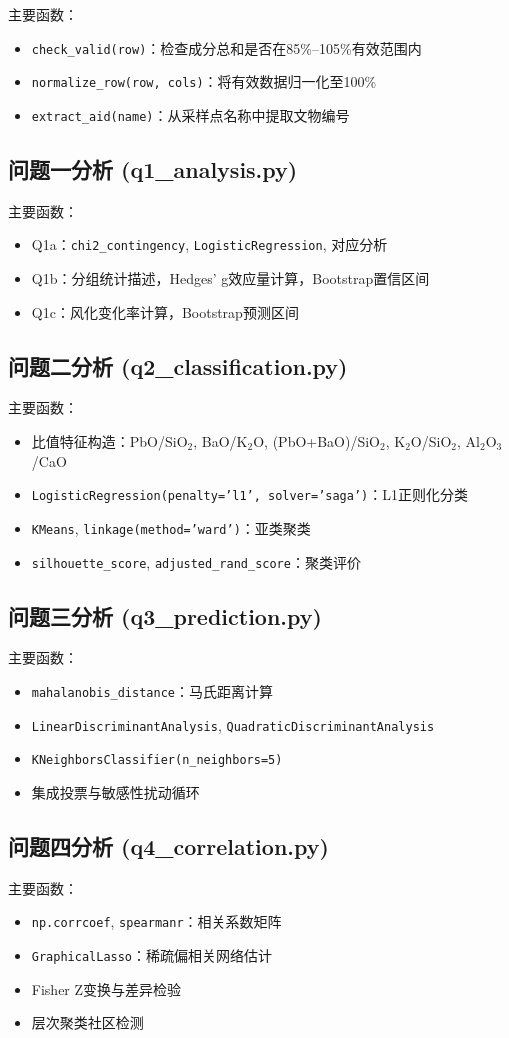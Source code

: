 \documentclass[fontset=windows, 12pt, a4paper]{ctexart}
\begin{document}
主要函数：
\begin{itemize}
\item \texttt{check\_valid(row)}：检查成分总和是否在85\%--105\%有效范围内
\item \texttt{normalize\_row(row, cols)}：将有效数据归一化至100\%
\item \texttt{extract\_aid(name)}：从采样点名称中提取文物编号
\end{itemize}

\subsection*{问题一分析 (q1\_analysis.py)}

主要函数：
\begin{itemize}
\item Q1a：\texttt{chi2\_contingency}, \texttt{LogisticRegression}, 对应分析
\item Q1b：分组统计描述，Hedges' g效应量计算，Bootstrap置信区间
\item Q1c：风化变化率计算，Bootstrap预测区间
\end{itemize}

\subsection*{问题二分析 (q2\_classification.py)}

主要函数：
\begin{itemize}
\item 比值特征构造：PbO/SiO$_2$, BaO/K$_2$O, (PbO+BaO)/SiO$_2$, K$_2$O/SiO$_2$, Al$_2$O$_3$/CaO
\item \texttt{LogisticRegression(penalty='l1', solver='saga')}：L1正则化分类
\item \texttt{KMeans}, \texttt{linkage(method='ward')}：亚类聚类
\item \texttt{silhouette\_score}, \texttt{adjusted\_rand\_score}：聚类评价
\end{itemize}

\subsection*{问题三分析 (q3\_prediction.py)}

主要函数：
\begin{itemize}
\item \texttt{mahalanobis\_distance}：马氏距离计算
\item \texttt{LinearDiscriminantAnalysis}, \texttt{QuadraticDiscriminantAnalysis}
\item \texttt{KNeighborsClassifier(n\_neighbors=5)}
\item 集成投票与敏感性扰动循环
\end{itemize}

\subsection*{问题四分析 (q4\_correlation.py)}

主要函数：
\begin{itemize}
\item \texttt{np.corrcoef}, \texttt{spearmanr}：相关系数矩阵
\item \texttt{GraphicalLasso}：稀疏偏相关网络估计
\item Fisher Z变换与差异检验
\item 层次聚类社区检测
\end{itemize}
\end{document}
